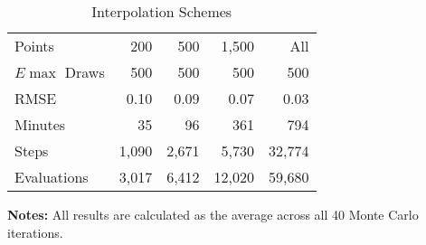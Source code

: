 \begin{table}\onehalfspacing
\begin{center}
\begin{threeparttable}
  \captionsetup{width=30cm}
  \caption{Interpolation Schemes}
  \label{Interpolation Schemes}
  \begin{tabular}{lrrrr}\toprule
  Points      & 200 & 500 & 1,500  & All \\
  $E\max$ Draws & 500 &  500 &   500 & 500 \\
  \midrule
  RMSE        & 0.10 &   0.09 &    0.07 &  0.03  \\
  Minutes     &  35 &      96 &    361 &   794 \\
  Steps       &  1,090 &   2,671 &   5,730 &  32,774 \\
  Evaluations & 3,017 &   6,412 &    12,020 & 59,680 \\ %
  \bottomrule
  \end{tabular}\scriptsize
  \begin{tablenotes}\item \textbf{Notes:} All results are calculated as the average across all 40 Monte Carlo iterations.
  \end{tablenotes}
  \end{threeparttable}
  \end{center}
\end{table}
